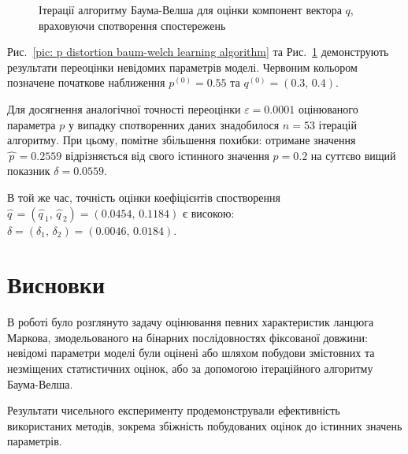 \documentclass[]{iptconf}
\theoremstyle{plain}
\begin{document}
\begin{figure}[H]\centering
    \caption{Ітерації алгоритму Баума-Велша для оцінки компонент вектора $q$, враховуючи спотворення спостережень}
    \label{pic: q distortion baum-welch learning algorithm}
\end{figure}

\newpage
Рис.~\ref{pic: p distortion baum-welch learning algorithm} та Рис.~\ref{pic: q distortion baum-welch learning algorithm} демонструють результати переоцінки невідомих параметрів моделі. Червоним кольором позначене початкове наближення $p^{(0)}=0.55$ та $q^{(0)}=(0.3,\,0.4)$. 

Для досягнення аналогічної точності переоцінки $\varepsilon=0.0001$ оцінюваного параметра $p$ у випадку спотворенних даних знадобилося $n=53$ ітерацій алгоритму. При цьому, помітне збільшення похибки: отримане значення $\widehat{\,p\,}=0.2559$ відрізняється від свого істинного значення $p=0.2$ на суттєво вищий показник $\delta=0.0559$. 

В той же час, точність оцінки коефіцієнтів спостворення $\widehat{q\,} = \left( \widehat{q\,}_1,\,\widehat{q\,}_2 \right) = (0.0454,\,0.1184)$ є високою: $\delta=(\delta_1,\,\delta_2)=(0.0046,\,0.0184)$.

\section*{Висновки}

В роботі було розглянуто задачу оцінювання певних характеристик ланцюга Маркова, змодельованого на бінарних послідовностях фіксованої довжини: невідомі параметри моделі були оцінені або шляхом побудови змістовних та незміщених статистичних оцінок, або за допомогою ітераційного алгоритму Баума-Велша.

Результати чисельного експерименту продемонстрували ефективність використаних методів, зокрема збіжність побудованих оцінок до істинних значень параметрів.
\end{document}
